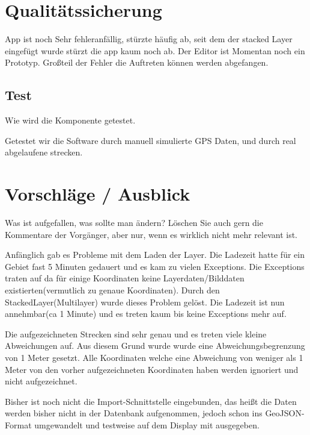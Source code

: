 \section{Qualitätssicherung}

App ist noch Sehr fehleranfällig, stürzte häufig ab, seit dem der stacked Layer eingefügt wurde stürzt die app kaum noch ab. Der Editor ist Momentan noch ein Prototyp.
Großteil der Fehler die Auftreten können werden abgefangen.

\subsection{Test}
Wie wird die Komponente getestet.

Getestet wir die Software durch manuell simulierte GPS Daten, und durch real abgelaufene strecken.

\section{Vorschläge / Ausblick}
Was ist aufgefallen, was sollte man ändern? Löschen Sie auch gern die Kommentare
der Vorgänger, aber nur, wenn es wirklich nicht mehr relevant ist.

Anfänglich gab es Probleme mit dem Laden der Layer. Die Ladezeit hatte für ein Gebiet fast 5 Minuten gedauert und es kam zu vielen Exceptions. Die Exceptions traten auf da für einige Koordinaten keine Layerdaten/Bilddaten existierten(vermutlich zu genaue Koordinaten). Durch den StackedLayer(Multilayer) wurde dieses Problem gelöst. Die Ladezeit ist nun annehmbar(ca 1 Minute) und es treten kaum bis keine Exceptions mehr auf.

Die aufgezeichneten Strecken sind sehr genau und es treten viele kleine Abweichungen auf. Aus diesem Grund wurde wurde eine Abweichungsbegrenzung von 1 Meter gesetzt. Alle Koordinaten welche eine Abweichung von weniger als 1 Meter von den vorher aufgezeichneten Koordinaten haben werden ignoriert und nicht aufgezeichnet.

Bisher ist noch nicht die Import-Schnittstelle eingebunden, das heißt die Daten werden bisher nicht in der Datenbank aufgenommen, jedoch schon ins GeoJSON-Format umgewandelt und testweise auf dem Display mit ausgegeben.

